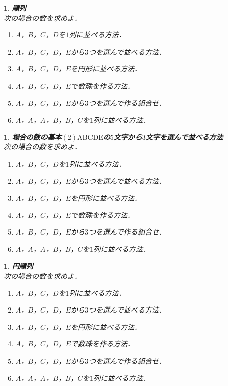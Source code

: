 \documentclass[10pt,
fleqn,
dvipdfmx,
uplatex
]{jsarticle}
\newtheorem{question}[Question]{}
\begin{document}
\begin{question}{\bf\boldmath 順列}\\
次の場合の数を求めよ．
\begin{enumerate}
\item $A$，$B$，$C$，$D$を$1$列に並べる方法．
\item $A$，$B$，$C$，$D$，$E$から$3$つを選んで並べる方法．
\item $A$，$B$，$C$，$D$，$E$を円形に並べる方法．
\item $A$，$B$，$C$，$D$，$E$で数珠を作る方法．
\item $A$，$B$，$C$，$D$，$E$から$3$つを選んで作る組合せ．
\item $A$，$A$，$A$，$B$，$B$，$C$を$1$列に並べる方法．
\end{enumerate}

\end{question}



\begin{question}{\bf\boldmath 場合の数の基本$\left(2\right)\text{ABCDE}$の$5$文字から$3$文字を選んで並べる方法}\\
次の場合の数を求めよ．
\begin{enumerate}
\item $A$，$B$，$C$，$D$を$1$列に並べる方法．
\item $A$，$B$，$C$，$D$，$E$から$3$つを選んで並べる方法．
\item $A$，$B$，$C$，$D$，$E$を円形に並べる方法．
\item $A$，$B$，$C$，$D$，$E$で数珠を作る方法．
\item $A$，$B$，$C$，$D$，$E$から$3$つを選んで作る組合せ．
\item $A$，$A$，$A$，$B$，$B$，$C$を$1$列に並べる方法．
\end{enumerate}

\end{question}



\begin{question}{\bf\boldmath 円順列}\\
次の場合の数を求めよ．
\begin{enumerate}
\item $A$，$B$，$C$，$D$を$1$列に並べる方法．
\item $A$，$B$，$C$，$D$，$E$から$3$つを選んで並べる方法．
\item $A$，$B$，$C$，$D$，$E$を円形に並べる方法．
\item $A$，$B$，$C$，$D$，$E$で数珠を作る方法．
\item $A$，$B$，$C$，$D$，$E$から$3$つを選んで作る組合せ．
\item $A$，$A$，$A$，$B$，$B$，$C$を$1$列に並べる方法．
\end{enumerate}

\end{question}
\end{document}
